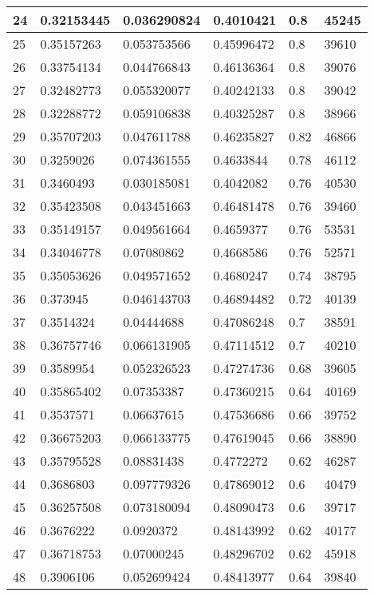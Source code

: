 \begin{longtable}{|l|l|l|l|l|l|}
24 & 0.32153445 & 0.036290824 & 0.4010421 & 0.8 & 45245 \\ \hline 
25 & 0.35157263 & 0.053753566 & 0.45996472 & 0.8 & 39610 \\ \hline 
26 & 0.33754134 & 0.044766843 & 0.46136364 & 0.8 & 39076 \\ \hline 
27 & 0.32482773 & 0.055320077 & 0.40242133 & 0.8 & 39042 \\ \hline 
28 & 0.32288772 & 0.059106838 & 0.40325287 & 0.8 & 38966 \\ \hline 
29 & 0.35707203 & 0.047611788 & 0.46235827 & 0.82 & 46866 \\ \hline 
30 & 0.3259026 & 0.074361555 & 0.4633844 & 0.78 & 46112 \\ \hline 
31 & 0.3460493 & 0.030185081 & 0.4042082 & 0.76 & 40530 \\ \hline 
32 & 0.35423508 & 0.043451663 & 0.46481478 & 0.76 & 39460 \\ \hline 
33 & 0.35149157 & 0.049561664 & 0.4659377 & 0.76 & 53531 \\ \hline 
34 & 0.34046778 & 0.07080862 & 0.4668586 & 0.76 & 52571 \\ \hline 
35 & 0.35053626 & 0.049571652 & 0.4680247 & 0.74 & 38795 \\ \hline 
36 & 0.373945 & 0.046143703 & 0.46894482 & 0.72 & 40139 \\ \hline 
37 & 0.3514324 & 0.04444688 & 0.47086248 & 0.7 & 38591 \\ \hline 
38 & 0.36757746 & 0.066131905 & 0.47114512 & 0.7 & 40210 \\ \hline 
39 & 0.3589954 & 0.052326523 & 0.47274736 & 0.68 & 39605 \\ \hline 
40 & 0.35865402 & 0.07353387 & 0.47360215 & 0.64 & 40169 \\ \hline 
41 & 0.3537571 & 0.06637615 & 0.47536686 & 0.66 & 39752 \\ \hline 
42 & 0.36675203 & 0.066133775 & 0.47619045 & 0.66 & 38890 \\ \hline 
43 & 0.35795528 & 0.08831438 & 0.4772272 & 0.62 & 46287 \\ \hline 
44 & 0.3686803 & 0.097779326 & 0.47869012 & 0.6 & 40479 \\ \hline 
45 & 0.36257508 & 0.073180094 & 0.48090473 & 0.6 & 39717 \\ \hline 
46 & 0.3676222 & 0.0920372 & 0.48143992 & 0.62 & 40177 \\ \hline 
47 & 0.36718753 & 0.07000245 & 0.48296702 & 0.62 & 45918 \\ \hline 
48 & 0.3906106 & 0.052699424 & 0.48413977 & 0.64 & 39840 \\ \hline 

\end{longtable}
